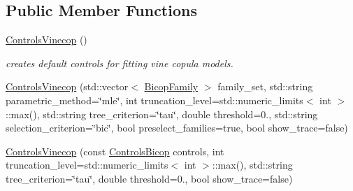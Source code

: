 \subsection*{Public Member Functions}
\begin{DoxyCompactItemize}
\item 
\hyperlink{classvinecopulib_1_1_controls_vinecop_a52054b73961271e179f7eaf74b4152de}{Controls\+Vinecop} ()\hypertarget{classvinecopulib_1_1_controls_vinecop_a52054b73961271e179f7eaf74b4152de}{}\label{classvinecopulib_1_1_controls_vinecop_a52054b73961271e179f7eaf74b4152de}

\begin{DoxyCompactList}\small\item\em creates default controls for fitting vine copula models. \end{DoxyCompactList}\item 
\hyperlink{classvinecopulib_1_1_controls_vinecop_add9c80d717ee3443456b81b1c79611a4}{Controls\+Vinecop} (std\+::vector$<$ \hyperlink{namespacevinecopulib_a42e95cc06d33896199caab0c11ad44f3}{Bicop\+Family} $>$ family\+\_\+set, std\+::string parametric\+\_\+method=\char`\"{}mle\char`\"{}, int truncation\+\_\+level=std\+::numeric\+\_\+limits$<$ int $>$\+::max(), std\+::string tree\+\_\+criterion=\char`\"{}tau\char`\"{}, double threshold=0., std\+::string selection\+\_\+criterion=\char`\"{}bic\char`\"{}, bool preselect\+\_\+families=true, bool show\+\_\+trace=false)
\item 
\hyperlink{classvinecopulib_1_1_controls_vinecop_aa63e4b40ed55179657052b15b5eed872}{Controls\+Vinecop} (const \hyperlink{classvinecopulib_1_1_controls_bicop}{Controls\+Bicop} controls, int truncation\+\_\+level=std\+::numeric\+\_\+limits$<$ int $>$\+::max(), std\+::string tree\+\_\+criterion=\char`\"{}tau\char`\"{}, double threshold=0., bool show\+\_\+trace=false)
\end{DoxyCompactItemize}
{\bf }\par
